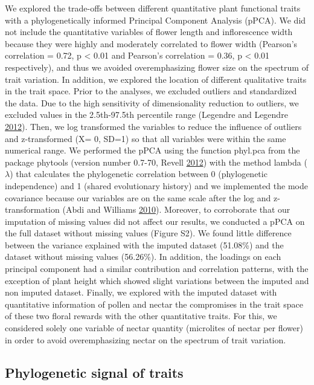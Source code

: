 \documentclass[12pt,a4paper,]{article}
\begin{document}
We explored the trade-offs between different quantitative plant
functional traits with a phylogenetically informed Principal Component
Analysis (pPCA). We did not include the quantitative variables of flower
length and inflorescence width because they were highly and moderately
correlated to flower width (Pearson's correlation = 0.72, p \textless{}
0.01 and Pearson's correlation = 0.36, p \textless{} 0.01 respectively),
and thus we avoided overemphasizing flower size on the spectrum of trait
variation. In addition, we explored the location of different
qualitative traits in the trait space. Prior to the analyses, we
excluded outliers and standardized the data. Due to the high sensitivity
of dimensionality reduction to outliers, we excluded values in the
2.5th-97.5th percentile range (Legendre and Legendre
\protect\hyperlink{ref-legendre2012}{2012}). Then, we log transformed
the variables to reduce the influence of outliers and z-transformed (X=
0, SD=1) so that all variables were within the same numerical range. We
performed the pPCA using the function phyl.pca from the package phytools
(version number 0.7-70, Revell \protect\hyperlink{ref-revell2012}{2012})
with the method lambda (\(\lambda\)) that calculates the phylogenetic
correlation between 0 (phylogenetic independence) and 1 (shared
evolutionary history) and we implemented the mode covariance because our
variables are on the same scale after the log and z-transformation (Abdi
and Williams \protect\hyperlink{ref-abdi2010}{2010}). Moreover, to
corroborate that our imputation of missing values did not affect our
results, we conducted a pPCA on the full dataset without missing values
(Figure S2). We found little difference between the variance explained
with the imputed dataset (51.08\%) and the dataset without missing
values (56.26\%). In addition, the loadings on each principal component
had a similar contribution and correlation patterns, with the exception
of plant height which showed slight variations between the imputed and
non imputed dataset. Finally, we explored with the imputed dataset with
quantitative information of pollen and nectar the compromises in the
trait space of these two floral rewards with the other quantitative
traits. For this, we considered solely one variable of nectar quantity
(microlites of nectar per flower) in order to avoid overemphasizing
nectar on the spectrum of trait variation.

\subsection{Phylogenetic signal of
traits}\label{phylogenetic-signal-of-traits}
\end{document}
